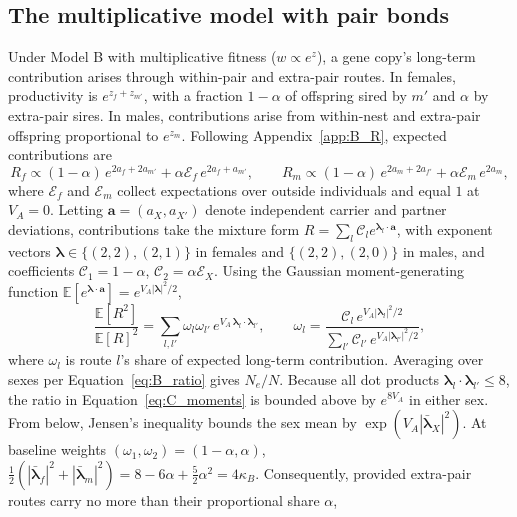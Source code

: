 \documentclass{article}
\begin{document}
\subsection{The multiplicative model with pair bonds}\label{app:C_mult}
Under Model B with multiplicative fitness ($w \propto e^{z}$), a gene copy's long-term contribution arises through within-pair and extra-pair routes. In females, productivity is $e^{z_f + z_{m'}}$, with a fraction $1 - \alpha$ of offspring sired by $m'$ and $\alpha$ by extra-pair sires. In males, contributions arise from within-nest and extra-pair offspring proportional to $e^{z_m}$. Following Appendix~\ref{app:B_R}, expected contributions are
\begin{equation}
    R_f \propto (1-\alpha)\,e^{2a_f + 2a_{m'}} + \alpha \mathcal{E}_f\,e^{2a_f + a_{m'}}, \qquad
    R_m \propto (1-\alpha)\,e^{2a_m + 2a_{f'}} + \alpha \mathcal{E}_m\,e^{2a_m},
\end{equation}
where $\mathcal{E}_f$ and $\mathcal{E}_m$ collect expectations over outside individuals and equal $1$ at $V_A = 0$. Letting $\mathbf{a} = (a_X, a_{X'})$ denote independent carrier and partner deviations, contributions take the mixture form $R = \sum_l \mathcal{C}_l e^{\boldsymbol{\lambda}_l\cdot\mathbf{a}}$, with exponent vectors $\boldsymbol{\lambda} \in \{(2,2), (2,1)\}$ in females and $\{(2,2), (2,0)\}$ in males, and coefficients $\mathcal{C}_1 = 1 - \alpha$, $\mathcal{C}_2 = \alpha\mathcal{E}_X$. Using the Gaussian moment-generating function $\mathbb{E}[e^{\boldsymbol{\lambda}\cdot\mathbf{a}}] = e^{V_A|\boldsymbol{\lambda}|^2/2}$,
\begin{equation}
    \frac{\mathbb{E}[R^2]}{\mathbb{E}[R]^2} = \sum_{l,l'} \omega_l \omega_{l'}\, e^{V_A\,\boldsymbol{\lambda}_l\cdot\boldsymbol{\lambda}_{l'}}, \qquad
    \omega_l = \frac{\mathcal{C}_l\, e^{V_A|\boldsymbol{\lambda}_l|^2/2}}{\sum_{l'} \mathcal{C}_{l'}\, e^{V_A|\boldsymbol{\lambda}_{l'}|^2/2}}, \label{eq:C_moments}
\end{equation}
where $\omega_l$ is route $l$'s share of expected long-term contribution. Averaging over sexes per Equation~\eqref{eq:B_ratio} gives $N_e/N$. Because all dot products $\boldsymbol{\lambda}_l\cdot\boldsymbol{\lambda}_{l'} \le 8$, the ratio in Equation~\eqref{eq:C_moments} is bounded above by $e^{8V_A}$ in either sex. From below, Jensen's inequality bounds the sex mean by $\exp(V_A|\bar{\boldsymbol{\lambda}}_X|^2)$. At baseline weights $(\omega_1, \omega_2) = (1-\alpha, \alpha)$, $\tfrac{1}{2}(|\bar{\boldsymbol{\lambda}}_f|^2 + |\bar{\boldsymbol{\lambda}}_m|^2) = 8 - 6\alpha + \tfrac{5}{2}\alpha^2 = 4\kappa_B$. Consequently, provided extra-pair routes carry no more than their proportional share $\alpha$,
\end{document}
